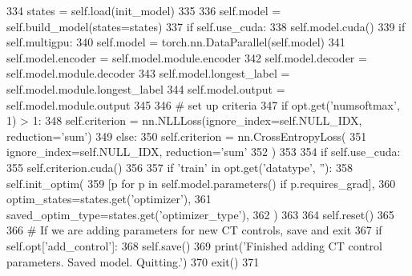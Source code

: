 \begin{DoxyCode}
334                 states = self.load(init\_model)
335 
336             self.model = self.build\_model(states=states)
337             \textcolor{keywordflow}{if} self.use\_cuda:
338                 self.model.cuda()
339                 \textcolor{keywordflow}{if} self.multigpu:
340                     self.model = torch.nn.DataParallel(self.model)
341                     self.model.encoder = self.model.module.encoder
342                     self.model.decoder = self.model.module.decoder
343                     self.model.longest\_label = self.model.module.longest\_label
344                     self.model.output = self.model.module.output
345 
346         \textcolor{comment}{# set up criteria}
347         \textcolor{keywordflow}{if} opt.get(\textcolor{stringliteral}{'numsoftmax'}, 1) > 1:
348             self.criterion = nn.NLLLoss(ignore\_index=self.NULL\_IDX, reduction=\textcolor{stringliteral}{'sum'})
349         \textcolor{keywordflow}{else}:
350             self.criterion = nn.CrossEntropyLoss(
351                 ignore\_index=self.NULL\_IDX, reduction=\textcolor{stringliteral}{'sum'}
352             )
353 
354         \textcolor{keywordflow}{if} self.use\_cuda:
355             self.criterion.cuda()
356 
357         \textcolor{keywordflow}{if} \textcolor{stringliteral}{'train'} \textcolor{keywordflow}{in} opt.get(\textcolor{stringliteral}{'datatype'}, \textcolor{stringliteral}{''}):
358             self.init\_optim(
359                 [p \textcolor{keywordflow}{for} p \textcolor{keywordflow}{in} self.model.parameters() \textcolor{keywordflow}{if} p.requires\_grad],
360                 optim\_states=states.get(\textcolor{stringliteral}{'optimizer'}),
361                 saved\_optim\_type=states.get(\textcolor{stringliteral}{'optimizer\_type'}),
362             )
363 
364         self.reset()
365 
366         \textcolor{comment}{# If we are adding parameters for new CT controls, save and exit}
367         \textcolor{keywordflow}{if} self.opt[\textcolor{stringliteral}{'add\_control'}]:
368             self.save()
369             print(\textcolor{stringliteral}{'Finished adding CT control parameters. Saved model. Quitting.'})
370             exit()
371 
\end{DoxyCode}


